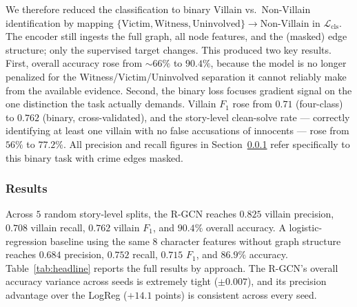\documentclass[11pt]{article}
\theoremstyle{definition}
\begin{document}
We therefore reduced the classification to binary Villain vs.~Non-Villain identification by mapping $\{\text{Victim}, \text{Witness}, \text{Uninvolved}\} \to \text{Non-Villain}$ in $\mathcal{L}_{\text{cls}}$. The encoder still ingests the full graph, all node features, and the (masked) edge structure; only the supervised target changes. This produced two key results. First, overall accuracy rose from $\sim\!66\%$ to $90.4\%$, because the model is no longer penalized for the Witness/Victim/Uninvolved separation it cannot reliably make from the available evidence. Second, the binary loss focuses gradient signal on the one distinction the task actually demands. Villain $F_1$ rose from $0.71$ (four-class) to $0.762$ (binary, cross-validated), and the story-level clean-solve rate --- correctly identifying at least one villain with no false accusations of innocents --- rose from $56\%$ to $77.2\%$. All precision and recall figures in Section~\ref{sec:results} refer specifically to this binary task with crime edges masked.

\subsubsection{Results}
\label{sec:results}

Across $5$ random story-level splits, the R-GCN reaches $0.825$ villain precision, $0.708$ villain recall, $0.762$ villain $F_1$, and $90.4\%$ overall accuracy. A logistic-regression baseline using the same $8$ character features without graph structure reaches $0.684$ precision, $0.752$ recall, $0.715$ $F_1$, and $86.9\%$ accuracy. Table~\ref{tab:headline} reports the full results by approach. The R-GCN's overall accuracy variance across seeds is extremely tight ($\pm 0.007$), and its precision advantage over the LogReg ($+14.1$ points) is consistent across every seed.
\end{document}
